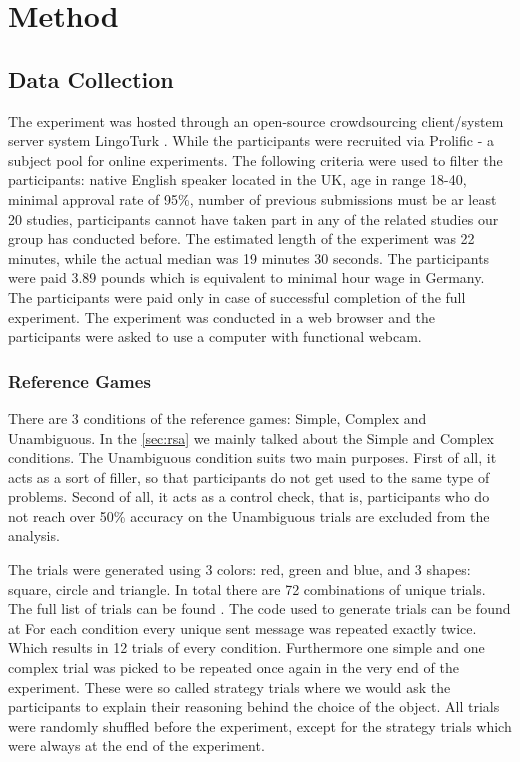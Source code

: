 ﻿\chapter{Method}

\section{Data Collection}
\label{sec:data}
The experiment was hosted through an open-source crowdsourcing client/system server system LingoTurk \cite{lingoturk}.
While the participants were recruited via Prolific \cite{prolific} - a subject pool for online experiments. The following criteria were used to filter the participants: native English speaker located in the UK, age in range 18-40, minimal approval rate of 95\%, number of previous submissions must be ar least 20 studies, participants cannot have taken part in any of the related studies our group has conducted before. The estimated length of the experiment was 22 minutes, while the actual median was 19 minutes 30 seconds. The participants were paid 3.89 pounds which is equivalent to minimal hour wage in Germany. The participants were paid only in case of successful completion of the full experiment. The experiment was conducted in a web browser and the participants were asked to use a computer with functional webcam. 


\subsection{Reference Games}
\label{sec:data:ref_games}
There are 3 conditions of the reference games: Simple, Complex and Unambiguous. In the \autoref{sec:rsa} we mainly talked about the Simple and Complex conditions. The Unambiguous condition suits two main purposes. First of all, it acts as a sort of filler, so that participants do not get used to the same type of problems. Second of all, it acts as a control check, that is, participants who do not reach over 50\% accuracy on the Unambiguous trials are excluded from the analysis.

The trials were generated using 3 colors: red, green and blue, and 3 shapes: square, circle and triangle. In total there are 72 combinations of unique trials. The full list of trials can be found . The code used to generate trials can be found at  For each condition every unique sent message was repeated exactly twice. Which results in 12 trials of every condition. Furthermore one simple and one complex trial was picked to be repeated once again in the very end of the experiment. These were so called strategy trials where we would ask the participants to explain their reasoning behind the choice of the object. All trials were randomly shuffled before the experiment, except for the strategy trials which were always at the end of the experiment.

